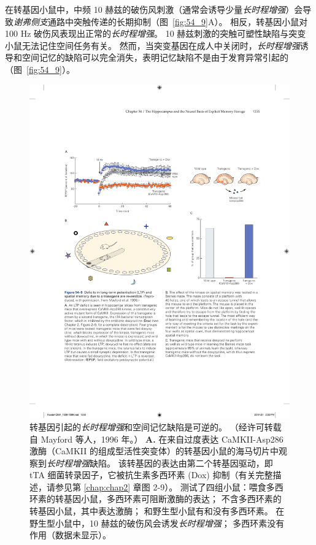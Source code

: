 在转基因小鼠中，中频 10 赫兹的破伤风刺激（通常会诱导少量\textit{长时程增强}）会导致\textit{谢弗侧支}通路中突触传递的长期抑制（图~\ref{fig:54_9}A）。
相反，转基因小鼠对 100 Hz 破伤风表现出正常的\textit{长时程增强}。
10 赫兹刺激的突触可塑性缺陷与突变小鼠无法记住空间任务有关。
然而，当突变基因在成人中关闭时，\textit{长时程增强}诱导和空间记忆的缺陷可以完全消失，表明记忆缺陷不是由于发育异常引起的（图~\ref{fig:54_9}）。


\begin{figure}[htbp]
	\centering
	\includegraphics[width=0.9\linewidth]{chap54/fig_54_9}
	\caption{转基因引起的\textit{长时程增强}和空间记忆缺陷是可逆的。 （经许可转载自 Mayford 等人，1996 年。）
		\textbf{A.} 在来自过度表达 CaMKII-Asp286 激酶（CaMKII 的组成型活性突变体）的转基因小鼠的海马切片中观察到\textit{长时程增强}缺陷。
		该转基因的表达由第二个转基因驱动，即 tTA 细菌转录因子，它被抗生素多西环素 (Dox) 抑制（有关完整描述，请参见第 \ref{chap:chap2} 章图 2-9）。
		测试了四组小鼠：喂食多西环素的转基因小鼠，多西环素可阻断激酶的表达；
		不含多西环素的转基因小鼠，其中表达激酶；
		和野生型小鼠有和没有多西环素。
		在野生型小鼠中，10 赫兹的破伤风会诱发\textit{长时程增强}；
		多西环素没有作用（数据未显示）。
}
\end{figure}
